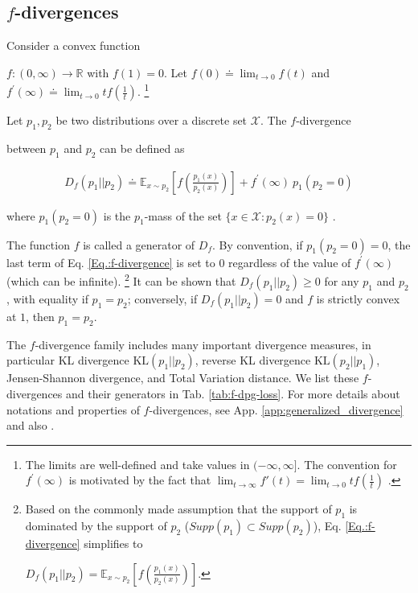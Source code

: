 \subsection{$f$-divergences}

Consider a convex function 

$f:(0,\infty)\rightarrow\mathbb{R}$ with $f(1) = 0$. Let $f(0) \doteq \lim_{t\rightarrow0}f(t)$ and $f^{'}(\infty)\doteq\lim_{t\rightarrow0} t f(\frac{1}{t})$.
\footnote{The limits are well-defined and take values in $(-\infty,\infty]$. The convention {for $f^{'}(\infty)$} is motivated by the fact that $\lim_{t\rightarrow \infty} f'(t) = \lim_{t\rightarrow 0} t f(\frac{1}{t})$ \cite{hiriart2013convex}. }

Let $p_1, p_2$ be two distributions over a discrete set $\mathcal{X}$.
The $f$-divergence 

between $p_1$ and $p_2$ can be defined as

\begin{align}
D_{f}(p_1||p_2)\doteq\mathbb{E}_{x\sim p_2}\left[f\left(\frac{p_1(x)}{p_2(x)}\right)\right]+f^{'}(\infty)\ p_1(p_2=0)
\label{Eq.:f-divergence} 
\end{align}

where $p_1(p_2=0)$ is the $p_1$-mass of the set $\{x\in \mathcal{X}:p_2(x)=0\}$ \cite{polyanski,liese2006divergences}.

The function $f$ is called a generator of $D_f$. By convention, if $p_1(p_2=0)=0$, the last term of Eq. \eqref{Eq.:f-divergence} is set to $0$ regardless of the value of $f^{'}(\infty)$ (which can be infinite).
\footnote{Based on the commonly made assumption that the support of $p_1$ is dominated by the support of $p_2$ ($Supp(p_1) \subset Supp(p_2)$), Eq. \eqref{Eq.:f-divergence} simplifies to

{$D_{f}(p_1||p_2)=\mathbb{E}_{x\sim p_2}\left[f\left(\frac{p_1(x)}{p_2(x)}\right)\right]$.}

} It can be shown that $D_{f}(p_1||p_2)\ge 0$ for any $p_1$ and $p_2$, {with equality if $p_1=p_2$; conversely,}  if $D_{f}(p_1||p_2) = 0$ and $f$ is strictly convex at $1$, then $p_1=p_2$.

The $f$-divergence family includes many important divergence measures, in particular KL divergence $\text{KL}(p_1||p_2)$, reverse KL divergence $\text{KL}(p_2||p_1)$, Jensen-Shannon divergence, and Total Variation distance. We list these $f$-divergences and their generators in Tab. \ref{tab:f-dpg-loss}. For more details about notations and properties of $f$-divergences, see App. \ref{app:generalized_divergence} and also \citet{liese2006divergences,polyanski, sason2016f,sason2018f}.

